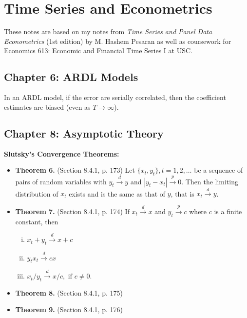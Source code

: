 \documentclass{article}
\begin{document}
\section{Time Series and Econometrics}

These notes are based on my notes from \textit{Time Series and Panel Data Econometrics} (1st edition) by M. Hashem Pesaran as well as coursework for Economics 613: Economic and Financial Time Series I at USC.

\subsection{Chapter 6: ARDL Models}

In an ARDL model, if the error are serially correlated, then the coefficient estimates are biased (even as \(T \to \infty\)).

\subsection{Chapter 8: Asymptotic Theory}

\textbf{Slutsky's Convergence Theorems:}

\begin{itemize}

\item \textbf{Theorem 6.} (Section 8.4.1, p. 173) Let \( \{x_t, y_t\}, t = 1, 2, \ldots\) be a sequence of pairs of random variables with \(y_t \xrightarrow{d} y\) and \(\left| y_t - x_t \right| \xrightarrow{p}  0\). Then the limiting distribution of \(x_t\) exists and is the same as that of \(y\), that is \(x_t \xrightarrow{d} y\).

\item \textbf{Theorem 7.} (Section 8.4.1, p. 174)  If \(x_t \xrightarrow{d} x\) and \(y_t \xrightarrow{p} c\) where \(c\) is a finite constant, then

\begin{enumerate}[(i)]

\item \(x_t + y_t \xrightarrow{d} x + c\)

\item \(y_tx_t \xrightarrow{d} cx\)

\item \(x_t/y_t \xrightarrow{d}  x/c, \text{ if } c \neq 0\).

\end{enumerate}

\item \textbf{Theorem 8.} (Section 8.4.1, p. 175) 

\item \textbf{Theorem 9.} (Section 8.4.1, p. 176) 

\end{itemize}
\end{document}
